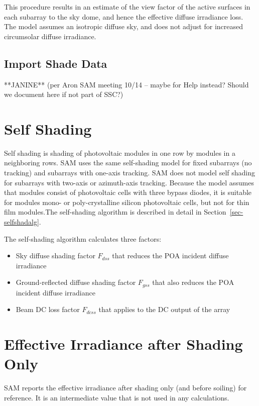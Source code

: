 \documentclass[12pt,letterpaper]{article}
\begin{document}
This procedure results in an estimate of the view factor of the active surfaces in each subarray to the sky dome, and hence the effective diffuse irradiance loss.  The model assumes an isotropic diffuse sky, and does not adjust for increased circumsolar diffuse irradiance.


\subsection{Import Shade Data}\label{sec-importshad}

**JANINE** (per Aron SAM meeting 10/14 -- maybe for Help instead? Should we document here if not part of SSC?)

\section{Self Shading}\label{sec-selfshad}

Self shading is shading of photovoltaic modules in one row by modules in a neighboring rows. SAM uses the same self-shading model for fixed subarrays (no tracking) and subarrays with one-axis tracking. SAM does not model self shading for subarrays with two-axis or azimuth-axis tracking. Because the model assumes that modules consist of photovoltaic cells with three bypass diodes, it is suitable for modules mono- or poly-crystalline silicon photovoltaic cells, but not for thin film modules.The self-shading algorithm is described in detail in Section~\ref{sec-selfshadalg}.

The self-shading algorithm calculates three factors:
\begin{itemize}
\item Sky diffuse shading factor $F_{dss}$ that reduces the POA incident diffuse irradiance
\item Ground-reflected diffuse shading factor $F_{gss}$ that also reduces the POA incident diffuse irradiance
\item Beam DC loss factor $F_{dcss}$ that applies to the DC output of the array
\end{itemize}

\section{Effective Irradiance after Shading Only}

SAM reports the effective irradiance after shading only (and before soiling) for reference. It is an intermediate value that is not used in any calculations.
\end{document}
